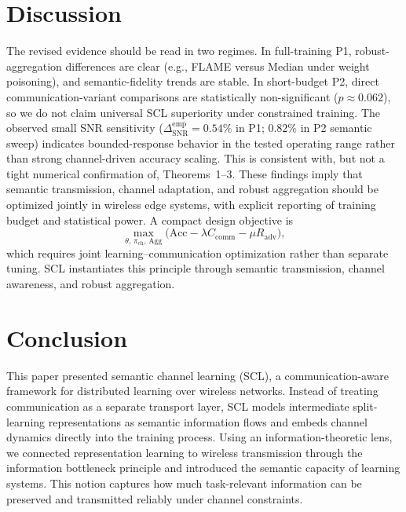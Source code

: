 \documentclass[10pt,journal]{IEEEtran}
\begin{document}
\section{Discussion}
The revised evidence should be read in two regimes. In full-training P1, robust-aggregation differences are clear (e.g., FLAME versus Median under weight poisoning), and semantic-fidelity trends are stable. In short-budget P2, direct communication-variant comparisons are statistically non-significant ($p\approx0.062$), so we do not claim universal SCL superiority under constrained training.
The observed small SNR sensitivity ($\Delta_{\mathrm{SNR}}^{\mathrm{emp}}=0.54\%$ in P1; $0.82\%$ in P2 semantic sweep) indicates bounded-response behavior in the tested operating range rather than strong channel-driven accuracy scaling. This is consistent with, but not a tight numerical confirmation of, Theorems~1--3.
These findings imply that semantic transmission, channel adaptation, and robust aggregation should be optimized jointly in wireless edge systems, with explicit reporting of training budget and statistical power. A compact design objective is
\begin{equation}
\max_{\theta,\,\pi_{\mathrm{ch}},\,\mathrm{Agg}}
\Big(\mathrm{Acc}
-\lambda C_{\mathrm{comm}}
-\mu R_{\mathrm{adv}}\Big),
\end{equation}
which requires joint learning--communication optimization rather than separate tuning\cite{8865093,10255264}. SCL instantiates this principle through semantic transmission, channel awareness, and robust aggregation\cite{8736011,9952954,8839651,8865093}.
\section{Conclusion}
This paper presented semantic channel learning (SCL), a communication-aware framework for distributed learning over wireless networks. Instead of treating communication as a separate transport layer, SCL models intermediate split-learning representations as semantic information flows and embeds channel dynamics directly into the training process. Using an information-theoretic lens, we connected representation learning to wireless transmission through the information bottleneck principle and introduced the semantic capacity of learning systems. This notion captures how much task-relevant information can be preserved and transmitted reliably under channel constraints.
\end{document}
